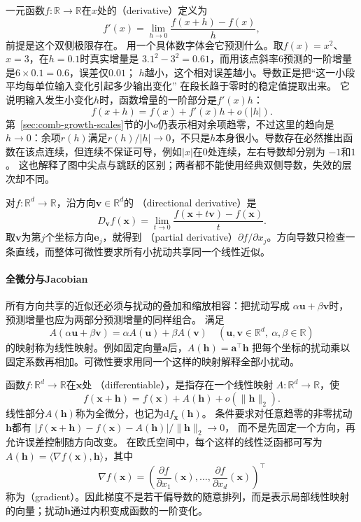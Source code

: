 一元函数$f:\mathbb{R}\to\mathbb{R}$在$x$处的（derivative）定义为
\[   f'(x)=\lim_{h\to0}\frac{f(x+h)-f(x)}{h}, \]
前提是这个双侧极限存在。
用一个具体数字体会它预测什么。取$f(x)=x^2$、$x=3$，在$h=0.1$时真实增量是
$3.1^2-3^2=0.61$，而用该点斜率$6$预测的一阶增量是$6\times0.1=0.6$，误差仅$0.01$；
$h$越小，这个相对误差越小。导数正是把“这一小段平均每单位输入变化引起多少输出变化”
在段长趋于零时的稳定值提取出来。
它说明输入发生小变化$h$时，函数增量的一阶部分是$f'(x)h$：
\begin{equation}
  f(x+h)=f(x)+f'(x)h+o(|h|).
\label{eq:analysis-scalar-first-order}
\end{equation}
第~\ref{sec:comb-growth-scales}节的小$o$仍表示相对余项趋零，不过这里的趋向是$h\to0$：余项$r(h)$满足$r(h)/|h|\to0$，不只是$h$本身很小。导数存在必然推出函数在该点连续，但连续不保证可导，例如$|x|$在$0$处连续，左右导数却分别为 $-1$和$1$。
这也解释了图中尖点与跳跃的区别；两者都不能使用经典双侧导数，失效的层次却不同。

对$f:\mathbb{R}^d\to\mathbb{R}$，沿方向$\bm{v}\in\mathbb{R}^d$的
（directional derivative）是
\[   D_{\bm{v}}f(\bm{x})   =   \lim_{t\to0}   \frac{f(\bm{x}+t\bm{v})-f(\bm{x})}{t}. \]
取$\bm{v}$为第$j$个坐标方向$\bm{e}_j$，就得到
（partial derivative）$\partial f/\partial x_j$。方向导数只检查一条直线，而整体可微性要求所有小扰动共享同一个线性近似。

\paragraph{全微分与Jacobian}

所有方向共享的近似还必须与扰动的叠加和缩放相容：把扰动写成
$\alpha\bm u+\beta\bm v$时，预测增量也应为两部分预测增量的同样组合。
满足
\[
 A(\alpha\bm u+\beta\bm v)=\alpha A(\bm u)+\beta A(\bm v)
 \quad(\bm u,\bm v\in\mathbb R^d,\ \alpha,\beta\in\mathbb R)
\]
的映射称为线性映射。例如固定向量$\bm a$后，$A(\bm h)=\bm a^\top\bm h$
把每个坐标的扰动乘以固定系数再相加。可微性要求用同一个这样的映射解释全部小扰动。

函数$f:\mathbb{R}^d\to\mathbb{R}$在$\bm{x}$处
（differentiable），是指存在一个线性映射 $A:\mathbb{R}^d\to\mathbb{R}$，使
\begin{equation}
  f(\bm{x}+\bm{h})
  =
  f(\bm{x})+A(\bm{h})+o(\lVert\bm{h}\rVert_2).
\label{eq:analysis-total-differentiability}
\end{equation}
线性部分$A(\bm h)$称为全微分，也记为$\mathrm df_{\bm x}(\bm h)$。
条件要求对任意趋零的非零扰动$\bm h$都有
$|f(\bm x+\bm h)-f(\bm x)-A(\bm h)|/\lVert\bm h\rVert_2\to0$，
而不是先固定一个方向，再允许误差控制随方向改变。
在欧氏空间中，每个这样的线性泛函都可写为 $A(\bm{h})=\langle\nabla f(\bm{x}),\bm{h}\rangle$，其中
\[   \nabla f(\bm{x})   =   \left(     \frac{\partial f}{\partial x_1}(\bm{x}),\ldots,     \frac{\partial f}{\partial x_d}(\bm{x})   \right)^{\top} \]
称为（gradient）。因此梯度不是若干偏导数的随意排列，而是表示局部线性映射的向量；扰动$\bm{h}$通过内积变成函数的一阶变化。

